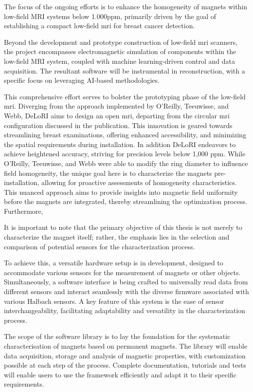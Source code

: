 The focus of the ongoing efforts is to enhance the homogeneity of
magnets within low-field MRI systems below 1.000ppm, primarily driven by
the goal of establishing a compact low-field \gls{mri} for breast cancer
detection.

Beyond the development and prototype construction of low-field \gls{mri}
scanners, the project encompasses electromagnetic simulation of
components within the low-field MRI system, coupled with machine
learning-driven control and data acquisition. The resultant software
will be instrumental in reconstruction, with a specific focus on
leveraging AI-based methodologies.

This comprehensive effort serves to bolster the prototyping phase of the
low-field \gls{mri}. Diverging from the approach implemented by
O'Reilly, Teeuwisse, and Webb, DeLoRI aims to design an open \gls{mri},
departing from the circular \gls{mri} configuration discussed in the
publication. This innovation is geared towards streamlining breast
examinations, offering enhanced accessibility, and minimizing the
spatial requirements during installation. In addition DeLoRI endeavors
to achieve heightened accuracy, striving for precision levels below
1,000 ppm. While O'Reilly, Teeuwisse, and Webb were able to modify the
ring diameter to influence field homogeneity, the unique goal here is to
characterize the magnets pre-installation, allowing for proactive
assessments of homogeneity characteristics. This nuanced approach aims
to provide insights into magnetic field uniformity before the magnets
are integrated, thereby streamlining the optimization process.
Furthermore,

It is important to note that the primary objective of this thesis is not
merely to characterize the magnet itself; rather, the emphasis lies in
the selection and comparison of potential sensors for the
characterization process.

To achieve this, a versatile hardware setup is in development, designed
to accommodate various sensors for the measurement of magnets or other
objects. Simultaneously, a software interface is being crafted to
universally read data from different sensors and interact seamlessly
with the diverse firmware associated with various Halbach sensors. A key
feature of this system is the ease of sensor interchangeability,
facilitating adaptability and versatility in the characterization
process.

The scope of the software library is to lay the foundation for the
systematic characterisation of magnets based on permanent magnets. The
library will enable data acquisition, storage and analysis of magnetic
properties, with customization possible at each step of the process.
Complete documentation, tutorials and tests will enable users to use the
framework efficiently and adapt it to their specific requirements.

